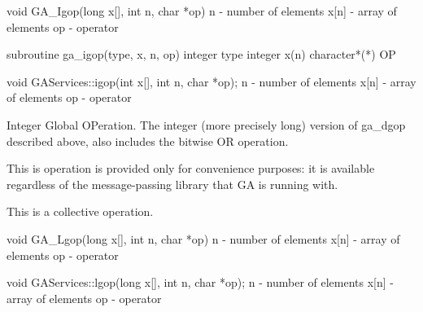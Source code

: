 \documentclass[12pt]{article}
\begin{document}

\begin{capi}
void GA_Igop(long x[], int n, char *op)
   n          - number of elements                                         \access{[input]} 
   x[n]       - array of elements                                    
   op         - operator                                                   \access{[input]} 
\end{capi}

\begin{fapi}
subroutine ga_igop(type, x, n, op)
   integer type                                                            \access{[input]} 
   integer x(n)                                                      
   character*(*) OP                                                        \access{[input]} 
\end{fapi}

\begin{cxxapi}
void GAServices::igop(int x[], int n, char *op);
   n          - number of elements                                         \access{[input]}
   x[n]       - array of elements                                   
   op         - operator                                                   \access{[input]}
\end{cxxapi}

\begin{desc}

Integer Global OPeration. The integer (more precisely long) version
of ga_dgop described above, also includes the bitwise OR operation.

This is operation is provided only for convenience purposes: it is 
available regardless of the message-passing library that GA is running with.

This is a collective operation.
\end{desc}


\begin{capi}
void GA_Lgop(long x[], int n, char *op)
   n          - number of elements                                         \access{[input]} 
   x[n]       - array of elements                                    
   op         - operator                                                   \access{[input]} 
\end{capi}

\begin{cxxapi}
void GAServices::lgop(long x[], int n, char *op);
   n          - number of elements                                         \access{[input]}
   x[n]       - array of elements                                   
   op         - operator                                                   \access{[input]}
\end{cxxapi}
\end{document}
